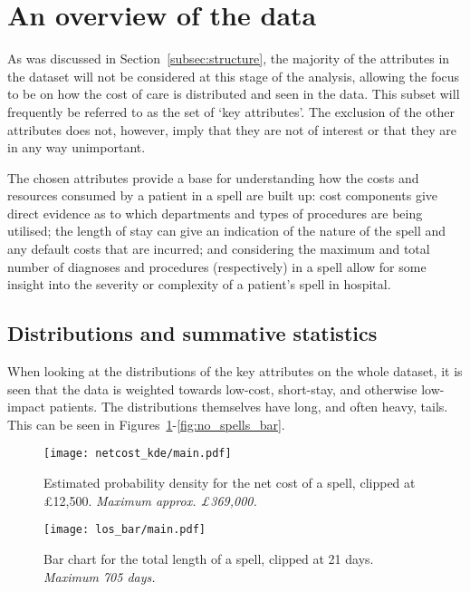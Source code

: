\section{An overview of the data}\label{sec:overview}

As was discussed in Section~\ref{subsec:structure}, the majority of the
attributes in the dataset will not be considered at this stage of the analysis,
allowing the focus to be on how the cost of care is distributed and seen in the
data. This subset will frequently be referred to as the set of `key attributes'.
The exclusion of the other attributes does not, however, imply that they
are not of interest or that they are in any way unimportant.

The chosen attributes provide a base for understanding how the costs and
resources consumed by a patient in a spell are built up: cost components give
direct evidence as to which departments and types of procedures are being
utilised; the length of stay can give an indication of the nature of the spell
and any default costs that are incurred; and considering the maximum and total
number of diagnoses and procedures (respectively) in a spell allow for some
insight into the severity or complexity of a patient's spell in hospital.

\subsection{Distributions and summative
statistics}\label{subsec:distributions_statistics}

When looking at the distributions of the key attributes on the whole dataset, it
is seen that the data is weighted towards low-cost, short-stay, and
otherwise low-impact patients. The distributions themselves have long, and often
heavy, tails. This can be seen in
Figures~\ref{fig:netcost_kde}\--\ref{fig:no_spells_bar}.

\begin{figure}[htbp]
    \centering
    \texttt{[image: netcost\_kde/main.pdf]}
    \caption{Estimated probability density for the net cost of a spell, clipped
        at \pounds12,500. \textit{Maximum approx.
        \pounds369,000.}}\label{fig:netcost_kde}
\end{figure}

\begin{figure}[htbp]
    \texttt{[image: los\_bar/main.pdf]}
    \caption{Bar chart for the total length of a spell, clipped at 21 days.
        \textit{Maximum 705 days.}}\label{fig:los_bar}
\end{figure}

